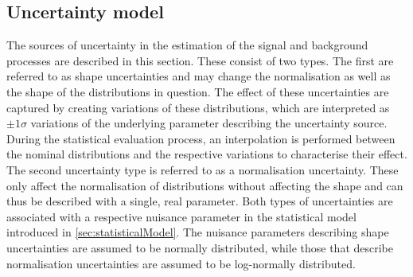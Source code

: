 \subsection{Uncertainty model}
\label{sec:uncertaintyModel} 
The sources of uncertainty in the estimation of the signal and background processes are described in this section. These consist of two types. The first are referred to as shape uncertainties and may change the normalisation as well as the shape of the distributions in question. The effect of these uncertainties are captured by creating variations of these distributions, which are interpreted as $\pm 1\sigma$ variations of the underlying parameter describing the uncertainty source. During the statistical evaluation process, an interpolation is performed between the nominal distributions and the respective variations to characterise their effect. The second uncertainty type is referred to as a normalisation uncertainty. These only affect the normalisation of distributions without affecting the shape and can thus be described with a single, real parameter. Both types of uncertainties are associated with a respective nuisance parameter in the statistical model introduced in \autoref{sec:statisticalModel}. The nuisance parameters describing shape uncertainties are assumed to be normally distributed, while those that describe normalisation uncertainties are assumed to be log-normally distributed. 
